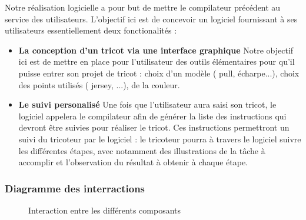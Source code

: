 \documentclass{article}
\begin{document}
Notre réalisation logicielle a pour but de mettre le compilateur précédent au service des utilisateurs. 
L'objectif ici est de concevoir un logiciel fournissant à ses utilisateurs essentiellement deux fonctionalités :
\begin{itemize} 
  \item \textbf{La conception d'un tricot via une interface graphique} Notre objectif ici est de mettre en place pour l'utilisateur des
  outils élémentaires pour qu'il puisse entrer son projet de tricot : choix d'un modèle ( pull, écharpe...), choix des points utilisés 
  ( jersey, ...), de la couleur.
  \item \textbf{Le suivi personalisé} Une fois que l'utilisateur aura saisi son tricot, le logiciel appelera le compilateur afin de générer 
la liste des instructions qui devront être suivies pour réaliser le tricot. Ces instructions permettront un suivi du tricoteur par le 
logiciel : le tricoteur pourra à travers le logiciel suivre les différentes étapes, avec notamment des illustrations de la tâche à 
accomplir et l'observation du résultat à obtenir à chaque étape.
\end{itemize}

\subsubsection{Diagramme des interractions}

    \begin{figure}[!h]
    \centering

    
    \caption{Interaction entre les différents composants}
    \label{ex:run-mots-finis}
    \end{figure}  
\end{document}
